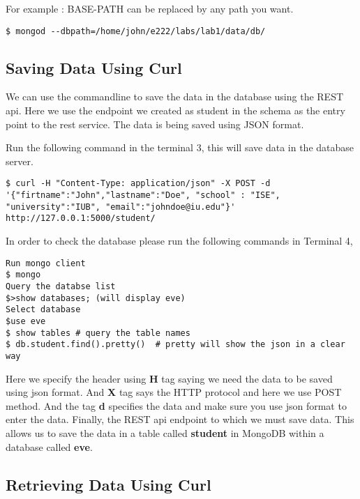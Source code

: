 \documentclass{article}
\begin{document}
For example :
BASE-PATH can be replaced by any path you want. 
\begin{verbatim}
$ mongod --dbpath=/home/john/e222/labs/lab1/data/db/
\end{verbatim}

\subsection{Saving Data Using Curl}

We can use the commandline to save the data in the database using the
REST api. Here we use the endpoint we created as student in the schema
as the entry point to the rest service. The data is being saved using
JSON format.

Run the following command in the terminal 3, this will save data in
the database server.

\begin{verbatim}
$ curl -H "Content-Type: application/json" -X POST -d 
'{"firtname":"John","lastname":"Doe", "school" : "ISE",
"university":"IUB", "email":"johndoe@iu.edu"}' http://127.0.0.1:5000/student/
\end{verbatim}

\newline

In order to check the database please run the following commands in Terminal 4,

\begin{verbatim}
Run mongo client
$ mongo
Query the databse list
$>show databases; (will display eve)  
Select database
$use eve  
$ show tables # query the table names
$ db.student.find().pretty()  # pretty will show the json in a clear way
\end{verbatim}

\newline

Here we specify the header using \textbf{H} tag saying we need the
data to be saved using json format. And \textbf{X} tag says the HTTP
protocol and here we use POST method. And the tag \textbf{d} specifies
the data and make sure you use json format to enter the data. Finally,
the REST api endpoint to which we must save data. This allows us to
save the data in a table called \textbf{student} in MongoDB within a
database called \textbf{eve}.

\subsection{Retrieving Data Using Curl}
\end{document}
